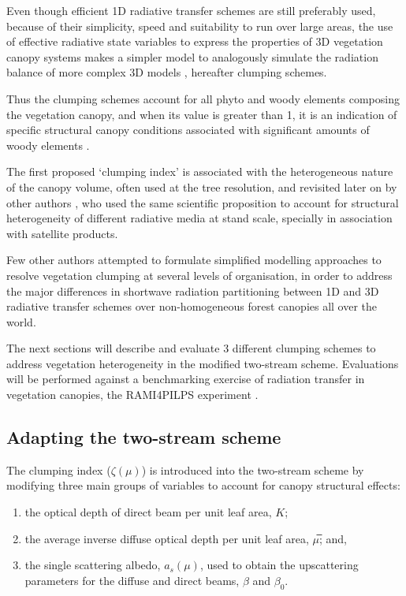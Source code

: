 \documentclass[a4paper,11pt]{report}
\begin{document}
Even though efficient 1D radiative transfer schemes are still preferably used, because of their simplicity, speed and suitability to run over large areas, the use of effective radiative state variables to express the properties of 3D vegetation canopy systems makes a simpler model to analogously simulate the radiation balance of more complex 3D models \citep{Pinty2004,pinty2006}, hereafter clumping schemes.

Thus the clumping schemes  account for all phyto and woody elements composing the vegetation canopy, and when its value is greater than 1, it is an indication of specific structural canopy conditions associated with significant amounts of woody elements \citep{pinty2006}. 

The first proposed `clumping index' \citep{Nilson1971,Norman1974,chen1992,Chen1996} is associated with the heterogeneous nature of the canopy volume, often used at the tree resolution, and revisited later on by other authors \citep{Pinty2004,pinty2006}, who used the same scientific proposition to account for structural heterogeneity of different radiative media at stand scale, specially in association with satellite products.

Few other authors \citep{Kucharik1999,pinty2006,Ni-Meister2010} attempted to formulate simplified modelling approaches to resolve vegetation clumping at several levels of organisation, in order to address the major differences in shortwave radiation partitioning between 1D and 3D radiative transfer schemes over non-homogeneous forest canopies all over the world.

The next sections will describe and evaluate 3 different clumping schemes to address vegetation heterogeneity in the modified two-stream scheme. Evaluations will be performed against a benchmarking exercise of radiation transfer in vegetation canopies, the RAMI4PILPS experiment \citep{Widlowski2011}.

\subsection{Adapting the two-stream scheme}

The clumping index ($\zeta(\mu)$) is introduced into the two-stream scheme by modifying three main groups of variables to account for canopy structural effects:

\begin{enumerate}
\item the optical depth of direct beam per unit leaf area, $K$; 
\item the average inverse diffuse optical depth per unit leaf area, $\mu$̅; and, 
\item the single scattering albedo, $a_s(\mu)$, used to obtain the upscattering parameters for the diffuse and direct beams, $\beta$ and $\beta_0$.
\end{enumerate}
\end{document}

